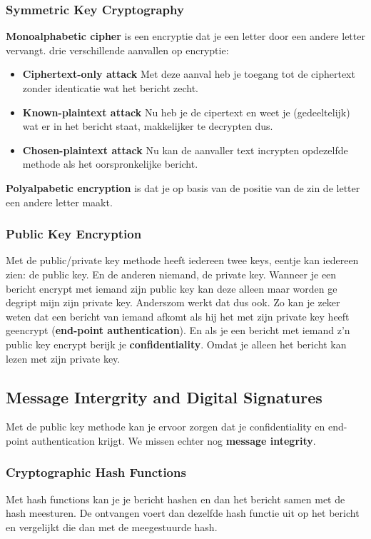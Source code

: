 \subsubsection{Symmetric Key Cryptography}
\textbf{Monoalphabetic cipher} is een encryptie dat je een letter door een andere letter vervangt.
drie verschillende aanvallen op encryptie:
\begin{itemize}
    \item \textbf{Ciphertext-only attack} Met deze aanval heb je toegang tot de ciphertext zonder identicatie wat het
    bericht zecht.
    \item \textbf{Known-plaintext attack} Nu heb je de cipertext en weet je (gedeeltelijk) wat er in het bericht
    staat, makkelijker te decrypten dus.
    \item \textbf{Chosen-plaintext attack} Nu kan de aanvaller text incrypten opdezelfde methode als het
    oorspronkelijke bericht.
\end{itemize}
\textbf{Polyalpabetic encryption} is dat je op basis van de positie van de zin de letter een andere letter maakt.

\subsubsection{Public Key Encryption}
Met de public/private key methode heeft iedereen twee keys, eentje kan iedereen zien: de public key. En de anderen
niemand, de private key. Wanneer je een bericht encrypt met iemand zijn public key kan deze alleen maar worden ge
degript mijn zijn private key. Anderszom werkt dat dus ook. Zo kan je zeker weten dat een bericht van iemand afkomt
als hij het met zijn private key heeft geencrypt (\textbf{end-point authentication}). En als je een bericht met iemand
z'n public key encrypt berijk je \textbf{confidentiality}. Omdat je alleen het bericht kan lezen met zijn private key.

\subsection{Message Intergrity and Digital Signatures}
Met de public key methode kan je ervoor zorgen dat je confidentiality en end-point authentication krijgt. We missen
echter nog \textbf{message integrity}.

\subsubsection{Cryptographic Hash Functions}
Met hash functions kan je je bericht hashen en dan het bericht samen met de hash meesturen. De ontvangen voert dan
dezelfde hash functie uit op het bericht en vergelijkt die dan met de meegestuurde hash.


